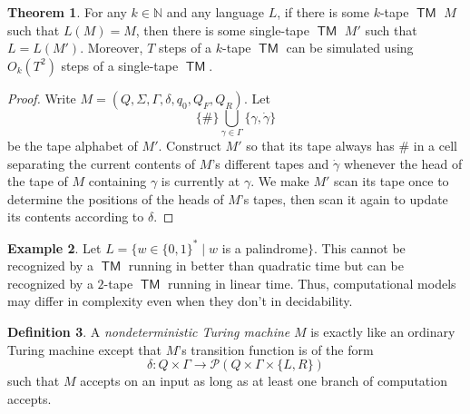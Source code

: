 \documentclass[10pt,letterpaper,cm]{nupset}
\theoremstyle{definition}
\newtheorem{definition}{Definition}[subsection]
\newtheorem{exmp}[definition]{Example}
\theoremstyle{theorem}
\newtheorem{theorem}[definition]{Theorem}
\theoremstyle{remark}
\newcommand{\N}{\mathbb N}
\renewcommand{\P}{\mathcal P}
\newcommand{\1}{\mathbf{1}}
\newcommand{\0}{\vec 0}
\DeclareMathOperator{\TM}{\mathsf{TM}}
\begin{document}
\begin{theorem}\label{equiv}
For any $k\in \N$ and any language $L$, if there is some $k$-tape $\TM$ $M$ such that $L(M) = M$, then there is some single-tape $\TM$ $M'$ such that $L = L(M')$. Moreover, $T$ steps of a $k$-tape $\TM$ can be simulated using $O_k(T^2)$ steps of a single-tape $\TM$.
\end{theorem}
\begin{proof}
Write $M= (Q, \Sigma, \Gamma, \delta, q_0, Q_F, Q_R)$. Let $$ \{\#\} \bigcup_{\gamma \in \Gamma} \{\gamma, \dot{\gamma} \}$$ be the tape alphabet of $M'$. Construct $M'$ so that its tape always has $\#$ in a cell separating  the current contents of $M$'s different tapes and $\dot{\gamma}$ whenever the head of the tape of $M$ containing $\gamma$ is currently at $\gamma$. We make $M'$ scan its tape once to determine the positions of the heads of $M$'s tapes, then scan it again to update its contents according to $\delta$.
\end{proof}

\begin{exmp}
Let $L = \{w \in \{0,1\}^{\ast} \mid w$ is a palindrome$\}$. This cannot be recognized by a $\TM$ running in better than quadratic time  but can be recognized by a $2$-tape $\TM$ running in linear time.  Thus, computational models may differ in complexity even when they don't in decidability.
\end{exmp}

\begin{definition}
A \textit{nondeterministic Turing machine} $M$ is exactly like an ordinary Turing machine except that $M$'s transition function is of the form $$ \delta : Q \times \Gamma \to \P(Q \times \Gamma \times \{L, R\})  $$ such that $M$ accepts on an input as long as at least one branch of computation accepts.
\end{definition}
\end{document}
